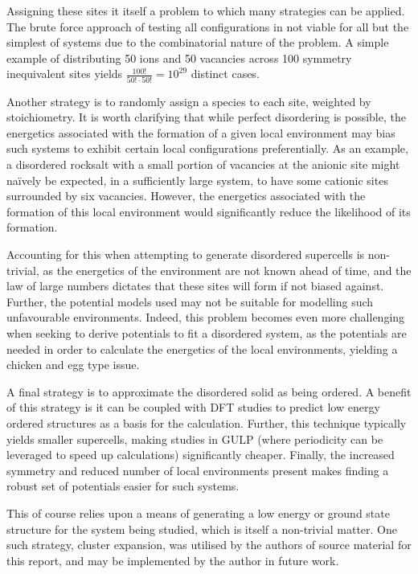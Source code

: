 Assigning these sites it itself a problem to which many strategies can be applied.
The brute force approach of testing all configurations in not viable for all but the simplest of systems due to the combinatorial nature of the problem.
A simple example of distributing 50 ions and 50 vacancies across 100 symmetry inequivalent sites yields $\frac{100!}{50!\cdot50!} = 10^{29}$ distinct cases.

Another strategy is to randomly assign a species to each site, weighted by stoichiometry.
It is worth clarifying that while perfect disordering is possible, the energetics associated with the formation of a given local environment may bias such systems to exhibit certain local configurations preferentially.
As an example, a disordered rocksalt with a small portion of vacancies at the anionic site might na{\"i}vely be expected, in a sufficiently large system, to have some cationic sites surrounded by six vacancies.
However, the energetics associated with the formation of this local environment would significantly reduce the likelihood of its formation.

Accounting for this when attempting to generate disordered supercells is non-trivial, as the energetics of the environment are not known ahead of time, and the law of large numbers dictates that these sites will form if not biased against.
Further, the potential models used may not be suitable for modelling such unfavourable environments.
Indeed, this problem becomes even more challenging when seeking to derive potentials to fit a disordered system, as the potentials are needed in order to calculate the energetics of the local environments, yielding a {\color{red} chicken and egg type} issue.

A final strategy is to approximate the disordered solid as being ordered.
A benefit of this strategy is it can be coupled with DFT studies to predict low energy ordered structures as a basis for the calculation.
Further, this technique typically yields smaller supercells, making studies in GULP (where periodicity can be leveraged to speed up calculations) significantly cheaper.
Finally, the increased symmetry and reduced number of local environments present makes finding a robust set of potentials easier for such systems.

This of course relies upon a means of generating a low energy or ground state structure for the system being studied, which is itself a non-trivial matter.
One such strategy, cluster expansion, \cite{Bhandari2019} was utilised by the authors of source material for this report, and may be implemented by the author in future work.


